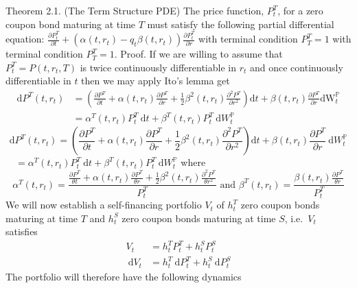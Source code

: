 \documentclass[12pt,twoside]{reedthesis}
\begin{document}
Theorem 2.1. (The Term Structure PDE) The price function, \(P_{t}^{T}\), for a zero coupon bond maturing at time \(T\) must satisfy the following partial differential equation:
\(\frac{\partial P_{t}^{T}}{\partial t}+\left(\alpha\left(t, r_{t}\right)-q_{t} \beta\left(t, r_{t}\right)\right) \frac{\partial P_{t}^{T}}{\partial r}\) with terminal condition \(P_{T}^{T}=1\)
with terminal condition \(P_{T}^{T}=1\). Proof. If we are willing to assume that \(P_{t}^{T}=P\left(t, r_{t}, T\right)\) is twice continuously differentiable in \(r_{t}\) and once continuously differentiable in \(t\) then we may apply Ito's lemma get
\[
\begin{aligned}
\mathrm{d} P^{T}\left(t, r_{t}\right) &=\left(\frac{\partial P^{T}}{\partial t}+\alpha\left(t, r_{t}\right) \frac{\partial P^{T}}{\partial r}+\frac{1}{2} \beta^{2}\left(t, r_{t}\right) \frac{\partial^{2} P^{T}}{\partial r^{2}}\right) \mathrm{d} t+\beta\left(t, r_{t}\right) \frac{\partial P^{T}}{\partial r} \mathrm{dW}_{t}^{\mathbb{P}} \\
&=\alpha^{T}\left(t, r_{t}\right) P_{t}^{T} \mathrm{~d} t+\beta^{T}\left(t, r_{t}\right) P_{t}^{T} \mathrm{~d} W_{t}^{\mathbb{P}}
\end{aligned}
\]
\[ \mathrm{d} P^{T}\left(t, r_{t}\right)=\left(\frac{\partial P^{T}}{\partial t}+\alpha\left(t, r_{t}\right) \frac{\partial P^{T}}{\partial r}+\frac{1}{2} \beta^{2}\left(t, r_{t}\right) \frac{\partial^{2} P^{T}}{\partial r^{2}}\right) \mathrm{d} t+\beta\left(t, r_{t}\right) \frac{\partial P^{T}}{\partial r} \mathrm{~d} W_{t}^{\mathbb{P}} \] \(\quad=\alpha^{T}\left(t, r_{t}\right) P_{t}^{T} \mathrm{~d} t+\beta^{T}\left(t, r_{t}\right) P_{t}^{T} \mathrm{~d} W_{t}^{\mathbb{P}}\) where \[ \alpha^{T}\left(t, r_{t}\right)=\frac{\frac{\partial P^{T}}{\theta t}+\alpha\left(t, r_{t}\right) \frac{\partial P^{T}}{\theta r}+\frac{1}{2} \beta^{2}\left(t, r_{t}\right) \frac{\partial^{2} P^{T}}{\theta r^{2}}}{P_{t}^{T}} \text { and } \beta^{T}\left(t, r_{t}\right)=\frac{\beta\left(t, r_{t}\right) \frac{\partial P^{T}}{\theta r}}{P_{t}^{T}} \]
We will now establish a self-financing portfolio \(V_{t}\) of \(h_{t}^{T}\) zero coupon bonds maturing at time \(T\) and \(h_{t}^{S}\) zero coupon bonds maturing at time \(S\), i.e.~\(V_{t}\) satisfies
\[
\begin{aligned}
V_{t} &=h_{t}^{T} P_{t}^{T}+h_{t}^{S} P_{t}^{S} \\
\mathrm{~d} V_{t} &=h_{t}^{T} \mathrm{~d} P_{t}^{T}+h_{t}^{S} \mathrm{~d} P_{t}^{S}
\end{aligned}
\]
The portfolio will therefore have the following dynamics
\end{document}
